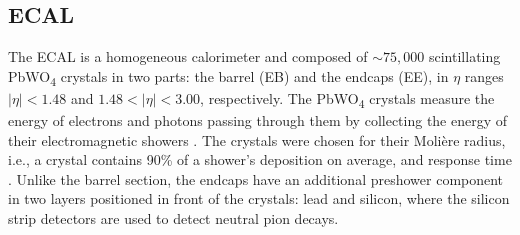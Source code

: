\documentclass[12pt]{article}
\begin{document}
\subsection{ECAL} %
The ECAL is a homogeneous calorimeter and composed of  ${\sim} 75,000$ scintillating PbWO\textsubscript{4} crystals in two parts: the barrel (EB) and the endcaps (EE), in $\eta$ ranges $|\eta| < 1.48$ and $1.48 < |\eta| < 3.00$, respectively. The PbWO\textsubscript{4} crystals measure the energy of electrons and photons passing through them by collecting the energy of their electromagnetic showers \cite{egamma_reco_2021}. The crystals were chosen for their Moli\`ere radius, i.e., a crystal contains 90\% of a shower's deposition on average, and response time \cite{ECAL_TDR}. Unlike the barrel section, the endcaps have an additional preshower component in two layers positioned in front of the crystals: lead and silicon, where the silicon strip detectors are used to detect neutral pion decays.\par


\end{document}
